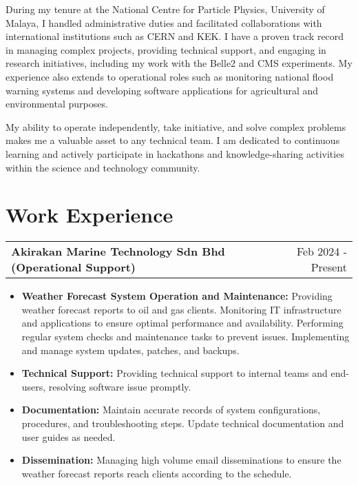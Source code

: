\documentclass[a4paper,12pt]{article}
\makeatletter
\newenvironment{joblong}[2]
    {
    \begin{tabularx}{\linewidth}{@{}l X r@{}}
    \textbf{#1} & \hfill &  #2 \\[3.75pt]
    \end{tabularx}
    \begin{minipage}[t]{\linewidth}
    \begin{itemize}[nosep,after=\strut, leftmargin=1em, itemsep=3pt,label=--]
    }
    {
    \end{itemize}
    \end{minipage}    
    }
\makeatother
\begin{document}
During my tenure at the National Centre for Particle Physics, University of Malaya, I handled administrative duties and facilitated collaborations with international institutions such as CERN and KEK. I have a proven track record in managing complex projects, providing technical support, and engaging in research initiatives, including my work with the Belle2 and CMS experiments. My experience also extends to operational roles such as monitoring national flood warning systems and developing software applications for agricultural and environmental purposes.

My ability to operate independently, take initiative, and solve complex problems makes me a valuable asset to any technical team. I am dedicated to continuous learning and actively participate in hackathons and knowledge-sharing activities within the science and technology community.


\section{Work Experience}

\begin{joblong}{Akirakan Marine Technology Sdn Bhd (Operational Support)}{Feb 2024 - Present}
\item \textbf{Weather Forecast System Operation and Maintenance:} Providing weather forecast reports to oil and gas clients. Monitoring IT infrastructure and applications to ensure optimal performance and availability. Performing regular system checks and maintenance tasks to prevent issues. Implementing and manage system updates, patches, and backups.
\item \textbf{Technical Support:} Providing technical support to internal teams and end-users, resolving software issue promptly.
\item \textbf{Documentation: } Maintain accurate records of system configurations, procedures, and troubleshooting steps. Update technical documentation and user guides as needed.
\item \textbf{Dissemination: } Managing high volume email disseminations to ensure the weather forecast reports reach clients according to the schedule.
\end{joblong}
\end{document}
